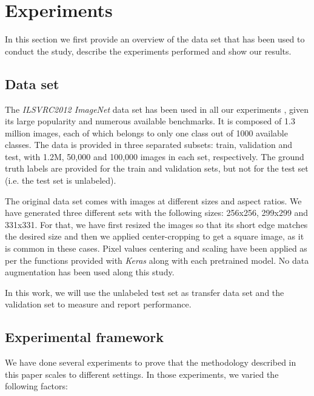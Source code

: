 \documentclass{elsarticle}
\begin{document}
	\section{Experiments} \label{sec:experiments}
	In this section we first provide an overview of the data set that has been used to conduct the study, describe the experiments performed and show our results.
	
	\subsection{Data set}
	The \textit{ILSVRC2012 ImageNet} data set has been used in all our experiments \cite{ILSVRC15}, given its large popularity and numerous available benchmarks. It is composed of 1.3 million images,  each of which belongs to only one class out of 1000 available classes. The data is provided in three separated subsets: train, validation and test, with 1.2M, 50,000 and 100,000 images in each set, respectively. The ground truth labels are provided for the train and validation sets, but not for the test set (i.e. the test set is unlabeled).
	
	The original data set comes with images at different sizes and aspect ratios. We have generated three different sets with the following sizes: 256x256, 299x299 and 331x331. For that, we have first resized the images so that its short edge matches the desired size and then we applied center-cropping to get a square image, as it is common in these cases. Pixel values centering and scaling have been applied as per the functions provided with \textit{Keras} along with each pretrained model. No data augmentation has been used along this study.
	
	In this work, we will use the unlabeled test set as transfer data set and the validation set to measure and report performance. 
	
	\subsection{Experimental framework}
	We have done several experiments to prove that the methodology described in this paper scales to different settings. In those experiments, we varied the following factors:
	
\end{document}
